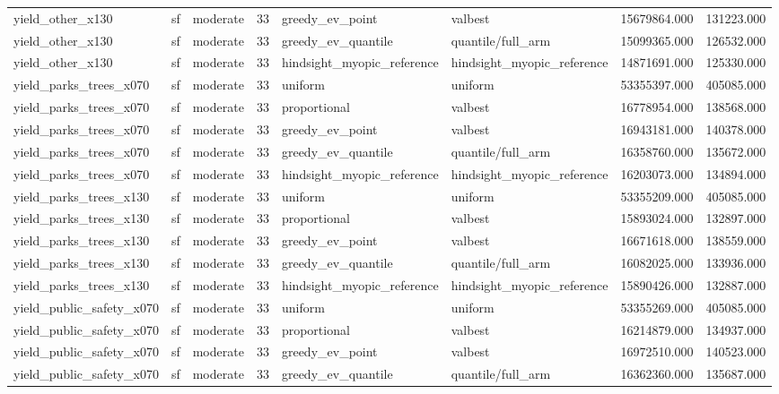 \begin{tabular}{lllrllrr}
yield\_other\_x130 & sf & moderate & 33 & greedy\_ev\_point & valbest & 15679864.000 & 131223.000 \\
yield\_other\_x130 & sf & moderate & 33 & greedy\_ev\_quantile & quantile/full\_arm & 15099365.000 & 126532.000 \\
yield\_other\_x130 & sf & moderate & 33 & hindsight\_myopic\_reference & hindsight\_myopic\_reference & 14871691.000 & 125330.000 \\
yield\_parks\_trees\_x070 & sf & moderate & 33 & uniform & uniform & 53355397.000 & 405085.000 \\
yield\_parks\_trees\_x070 & sf & moderate & 33 & proportional & valbest & 16778954.000 & 138568.000 \\
yield\_parks\_trees\_x070 & sf & moderate & 33 & greedy\_ev\_point & valbest & 16943181.000 & 140378.000 \\
yield\_parks\_trees\_x070 & sf & moderate & 33 & greedy\_ev\_quantile & quantile/full\_arm & 16358760.000 & 135672.000 \\
yield\_parks\_trees\_x070 & sf & moderate & 33 & hindsight\_myopic\_reference & hindsight\_myopic\_reference & 16203073.000 & 134894.000 \\
yield\_parks\_trees\_x130 & sf & moderate & 33 & uniform & uniform & 53355209.000 & 405085.000 \\
yield\_parks\_trees\_x130 & sf & moderate & 33 & proportional & valbest & 15893024.000 & 132897.000 \\
yield\_parks\_trees\_x130 & sf & moderate & 33 & greedy\_ev\_point & valbest & 16671618.000 & 138559.000 \\
yield\_parks\_trees\_x130 & sf & moderate & 33 & greedy\_ev\_quantile & quantile/full\_arm & 16082025.000 & 133936.000 \\
yield\_parks\_trees\_x130 & sf & moderate & 33 & hindsight\_myopic\_reference & hindsight\_myopic\_reference & 15890426.000 & 132887.000 \\
yield\_public\_safety\_x070 & sf & moderate & 33 & uniform & uniform & 53355269.000 & 405085.000 \\
yield\_public\_safety\_x070 & sf & moderate & 33 & proportional & valbest & 16214879.000 & 134937.000 \\
yield\_public\_safety\_x070 & sf & moderate & 33 & greedy\_ev\_point & valbest & 16972510.000 & 140523.000 \\
yield\_public\_safety\_x070 & sf & moderate & 33 & greedy\_ev\_quantile & quantile/full\_arm & 16362360.000 & 135687.000 \\

\end{tabular}
